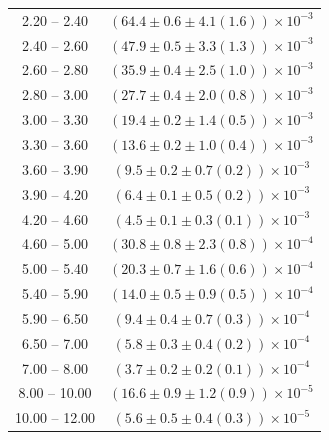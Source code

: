 \begin{table}
\begin{center}
\begin{tabular}{ c | c }
2.20 -- 2.40 & $(64.4\pm0.6\pm4.1(1.6))\times10^{-3}$ \\ 
2.40 -- 2.60 & $(47.9\pm0.5\pm3.3(1.3))\times10^{-3}$ \\ 
2.60 -- 2.80 & $(35.9\pm0.4\pm2.5(1.0))\times10^{-3}$ \\ 
2.80 -- 3.00 & $(27.7\pm0.4\pm2.0(0.8))\times10^{-3}$ \\ 
3.00 -- 3.30 & $(19.4\pm0.2\pm1.4(0.5))\times10^{-3}$ \\ 
3.30 -- 3.60 & $(13.6\pm0.2\pm1.0(0.4))\times10^{-3}$ \\ 
3.60 -- 3.90 & $(9.5\pm0.2\pm0.7(0.2))\times10^{-3}$ \\ 
3.90 -- 4.20 & $(6.4\pm0.1\pm0.5(0.2))\times10^{-3}$ \\ 
4.20 -- 4.60 & $(4.5\pm0.1\pm0.3(0.1))\times10^{-3}$ \\ 
4.60 -- 5.00 & $(30.8\pm0.8\pm2.3(0.8))\times10^{-4}$ \\ 
5.00 -- 5.40 & $(20.3\pm0.7\pm1.6(0.6))\times10^{-4}$ \\ 
5.40 -- 5.90 & $(14.0\pm0.5\pm0.9(0.5))\times10^{-4}$ \\ 
5.90 -- 6.50 & $(9.4\pm0.4\pm0.7(0.3))\times10^{-4}$ \\ 
6.50 -- 7.00 & $(5.8\pm0.3\pm0.4(0.2))\times10^{-4}$ \\ 
7.00 -- 8.00 & $(3.7\pm0.2\pm0.2(0.1))\times10^{-4}$ \\ 
8.00 -- 10.00 & $(16.6\pm0.9\pm1.2(0.9))\times10^{-5}$ \\ 
10.00 -- 12.00 & $(5.6\pm0.5\pm0.4(0.3))\times10^{-5}$ \\ 
\hline
\end{tabular}
\end{center}
\end{table}
 
